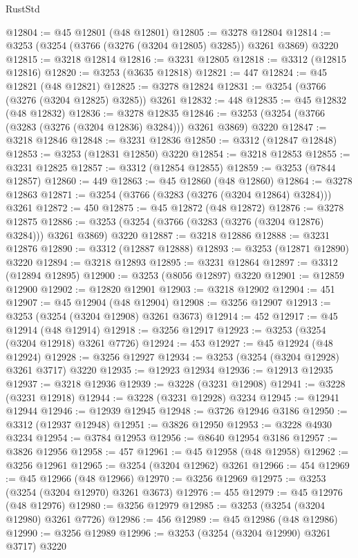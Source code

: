 \begin{lexlean}{RustStd}
\begin{coremodule}
{\begin{coremodule}
{{{{{{{{{{{{{{{{{{{{{{{{{{{{{{{{{{{{{@12804 := @45 @12801 (@48 @12801)
@12805 := @3278 @12804
@12814 := @3253 (@3254 (@3766 (@3276 (@3204 @12805) @3285)) @3261 @3869) @3220
@12815 := @3218 @12814
@12816 := @3231 @12805
@12818 := @3312 (@12815 @12816)
@12820 := @3253 (@3635 @12818)
@12821 := 447
@12824 := @45 @12821 (@48 @12821)
@12825 := @3278 @12824
@12831 := @3254 (@3766 (@3276 (@3204 @12825) @3285)) @3261
@12832 := 448
@12835 := @45 @12832 (@48 @12832)
@12836 := @3278 @12835
@12846 := @3253 (@3254 (@3766 (@3283 (@3276 (@3204 @12836) @3284))) @3261 @3869) @3220
@12847 := @3218 @12846
@12848 := @3231 @12836
@12850 := @3312 (@12847 @12848)
@12853 := @3253 (@12831 @12850) @3220
@12854 := @3218 @12853
@12855 := @3231 @12825
@12857 := @3312 (@12854 @12855)
@12859 := @3253 (@7844 @12857)
@12860 := 449
@12863 := @45 @12860 (@48 @12860)
@12864 := @3278 @12863
@12871 := @3254 (@3766 (@3283 (@3276 (@3204 @12864) @3284))) @3261
@12872 := 450
@12875 := @45 @12872 (@48 @12872)
@12876 := @3278 @12875
@12886 := @3253 (@3254 (@3766 (@3283 (@3276 (@3204 @12876) @3284))) @3261 @3869) @3220
@12887 := @3218 @12886
@12888 := @3231 @12876
@12890 := @3312 (@12887 @12888)
@12893 := @3253 (@12871 @12890) @3220
@12894 := @3218 @12893
@12895 := @3231 @12864
@12897 := @3312 (@12894 @12895)
@12900 := @3253 (@8056 @12897) @3220
@12901 := @12859 @12900
@12902 := @12820 @12901
@12903 := @3218 @12902
@12904 := 451
@12907 := @45 @12904 (@48 @12904)
@12908 := @3256 @12907
@12913 := @3253 (@3254 (@3204 @12908) @3261 @3673)
@12914 := 452
@12917 := @45 @12914 (@48 @12914)
@12918 := @3256 @12917
@12923 := @3253 (@3254 (@3204 @12918) @3261 @7726)
@12924 := 453
@12927 := @45 @12924 (@48 @12924)
@12928 := @3256 @12927
@12934 := @3253 (@3254 (@3204 @12928) @3261 @3717) @3220
@12935 := @12923 @12934
@12936 := @12913 @12935
@12937 := @3218 @12936
@12939 := @3228 (@3231 @12908)
@12941 := @3228 (@3231 @12918)
@12944 := @3228 (@3231 @12928) @3234
@12945 := @12941 @12944
@12946 := @12939 @12945
@12948 := @3726 @12946 @3186
@12950 := @3312 (@12937 @12948)
@12951 := @3826 @12950
@12953 := @3228 @4930 @3234
@12954 := @3784 @12953
@12956 := @8640 @12954 @3186
@12957 := @3826 @12956
@12958 := 457
@12961 := @45 @12958 (@48 @12958)
@12962 := @3256 @12961
@12965 := @3254 (@3204 @12962) @3261
@12966 := 454
@12969 := @45 @12966 (@48 @12966)
@12970 := @3256 @12969
@12975 := @3253 (@3254 (@3204 @12970) @3261 @3673)
@12976 := 455
@12979 := @45 @12976 (@48 @12976)
@12980 := @3256 @12979
@12985 := @3253 (@3254 (@3204 @12980) @3261 @7726)
@12986 := 456
@12989 := @45 @12986 (@48 @12986)
@12990 := @3256 @12989
@12996 := @3253 (@3254 (@3204 @12990) @3261 @3717) @3220
}}}}}}}}}}}}}}}}}}}}}}}}}}}}}}}}}}}}}
\end{coremodule}}
\end{coremodule}
\end{lexlean}
